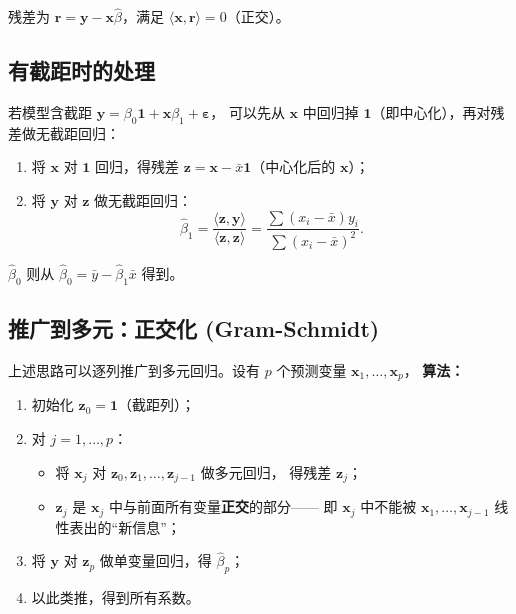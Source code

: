 残差为 $\mathbf{r} = \mathbf{y} - \mathbf{x}\hat{\beta}$，满足 $\langle \mathbf{x}, \mathbf{r} \rangle = 0$（正交）。

\subsection{有截距时的处理}

若模型含截距 $\mathbf{y} = \beta_0 \mathbf{1} + \mathbf{x}\beta_1 + \bm{\varepsilon}$，
可以先从 $\mathbf{x}$ 中回归掉 $\mathbf{1}$（即中心化），再对残差做无截距回归：

\begin{enumerate}[label=第 \arabic* 步：, leftmargin=*]
    \item 将 $\mathbf{x}$ 对 $\mathbf{1}$ 回归，得残差 $\mathbf{z} = \mathbf{x} - \bar{x}\mathbf{1}$（中心化后的 $\mathbf{x}$）；
    \item 将 $\mathbf{y}$ 对 $\mathbf{z}$ 做无截距回归：
    \[
        \hat{\beta}_1 = \frac{\langle \mathbf{z}, \mathbf{y} \rangle}{\langle \mathbf{z}, \mathbf{z} \rangle}
        = \frac{\sum (x_i - \bar{x}) y_i}{\sum (x_i - \bar{x})^2}.
    \]
\end{enumerate}

$\hat{\beta}_0$ 则从 $\hat{\beta}_0 = \bar{y} - \hat{\beta}_1 \bar{x}$ 得到。

\subsection{推广到多元：正交化 (Gram-Schmidt)}

上述思路可以逐列推广到多元回归。设有 $p$ 个预测变量 $\mathbf{x}_1, \dots, \mathbf{x}_p$，
\textbf{算法：}

\begin{enumerate}[label=第 \arabic* 步：, leftmargin=*]
    \item 初始化 $\mathbf{z}_0 = \mathbf{1}$（截距列）；
    \item 对 $j = 1, \dots, p$：
    \begin{itemize}
        \item 将 $\mathbf{x}_j$ 对 $\mathbf{z}_0, \mathbf{z}_1, \dots, \mathbf{z}_{j-1}$ 做多元回归，
        得残差 $\mathbf{z}_j$；
        \item $\mathbf{z}_j$ 是 $\mathbf{x}_j$ 中与前面所有变量\textbf{正交}的部分——
        即 $\mathbf{x}_j$ 中不能被 $\mathbf{x}_1, \dots, \mathbf{x}_{j-1}$ 线性表出的``新信息''；
    \end{itemize}
    \item 将 $\mathbf{y}$ 对 $\mathbf{z}_p$ 做单变量回归，得 $\hat{\beta}_p$；
    \item 以此类推，得到所有系数。
\end{enumerate}

